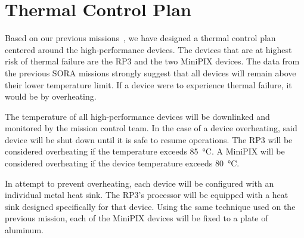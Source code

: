 \section{Thermal Control Plan}
\label{sec:TCP}


Based on our previous missions~\cite{SORA1}\cite{SORA2}, we have designed a thermal control plan centered around the high-performance devices. The devices that are at highest risk of thermal failure are the RP3 and the two MiniPIX devices. The data from the previous SORA missions strongly suggest that all devices will remain above their lower temperature limit. If a device were to experience thermal failure, it would be by overheating.

The temperature of all high-performance devices will be downlinked and monitored by the mission control team. In the case of a device overheating, said device will be shut down until it is safe to resume operations. The RP3 will be considered overheating if the temperature exceeds \SI{85}{\celsius}. A MiniPIX will be considered overheating if the device temperature exceeds \SI{80}{\celsius}.

In attempt to prevent overheating, each device will be configured with an individual metal heat sink. The RP3's processor will be equipped with a heat sink designed specifically for that device. Using the same technique used on the previous mission, each of the MiniPIX devices will be fixed to a plate of aluminum. 
